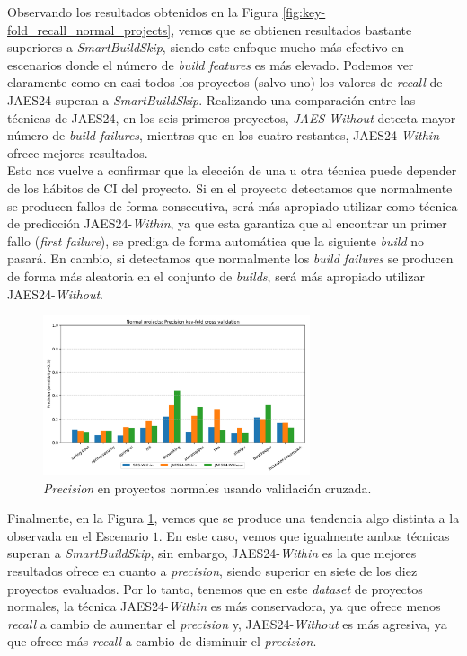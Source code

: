Observando los resultados obtenidos en la Figura \ref{fig:key-fold_recall_normal_projects}, vemos
que se obtienen resultados bastante superiores a \textit{SmartBuildSkip}, siendo este enfoque
mucho más efectivo en escenarios donde el número de \textit{build features} es más elevado. Podemos
ver claramente como en casi todos los proyectos (salvo uno) los valores de \textit{recall} de
JAES24 superan a \textit{SmartBuildSkip}. Realizando una comparación entre las técnicas
de JAES24, en los seis primeros proyectos, \textit{JAES-Without} detecta mayor número
de \textit{build failures}, mientras que en los cuatro restantes, JAES24-\textit{Within} ofrece
mejores resultados.\\

Esto nos vuelve a confirmar que la elección de una u otra técnica puede depender de los hábitos
de CI del proyecto. Si en el proyecto detectamos que normalmente se producen fallos
de forma consecutiva, será más apropiado utilizar como técnica de predicción
JAES24-\textit{Within}, ya que esta garantiza que al encontrar un primer fallo (\textit{first
failure}), se prediga de forma automática que la siguiente \textit{build} no pasará. En cambio,
si detectamos que normalmente los \textit{build failures} se producen de forma más aleatoria en
el conjunto de \textit{builds}, será más apropiado utilizar JAES24-\textit{Without}.

\begin{figure}[H]
    \centering
    \includegraphics[width=0.7\textwidth]{images/Normal projects: Precision key-fold cross validation.pdf}
    \caption{\textit{Precision} en proyectos normales usando validación cruzada.}
    \label{fig:key-fold_precision_normal_projects}
\end{figure}

Finalmente, en la Figura \ref{fig:key-fold_precision_normal_projects}, vemos que se produce una
tendencia algo distinta a la observada en el Escenario $1$. En este caso, vemos que igualmente
ambas técnicas superan a \textit{SmartBuildSkip}, sin embargo, JAES24-\textit{Within} es la que
mejores resultados ofrece en cuanto a \textit{precision}, siendo superior en siete de los diez
proyectos evaluados. Por lo tanto, tenemos que en este \textit{dataset} de proyectos normales, la
técnica JAES24-\textit{Within} es más conservadora, ya que ofrece menos \textit{recall} a cambio
de aumentar el \textit{precision} y, JAES24-\textit{Without} es más agresiva, ya que ofrece más
\textit{recall} a cambio de disminuir el \textit{precision}.\\

